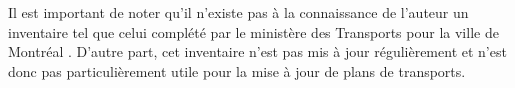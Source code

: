   Il est important de noter qu'il n'existe pas à la connaissance de l'auteur un inventaire tel que celui complété par le ministère des Transports pour la ville de Montréal \parencite{ConsortiumCIMA+-DanielArbouretassocies:InventaireEspaces:1998}. D'autre part, cet inventaire n'est pas mis à jour régulièrement et n'est donc pas particulièrement utile pour la mise à jour de plans de transports.